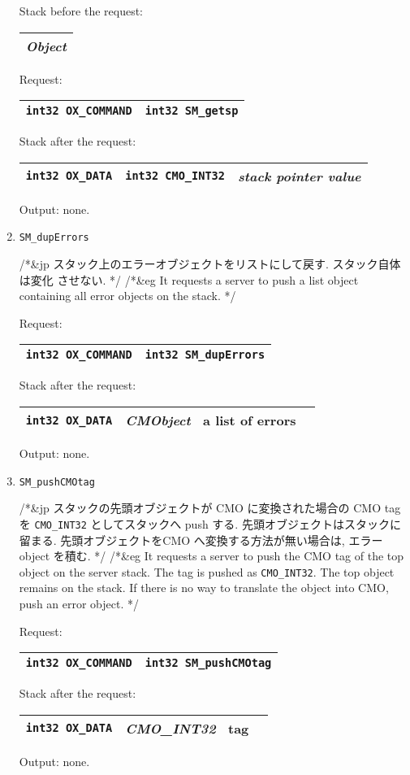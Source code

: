 \begin{enumerate}
Stack before the request:
\begin{tabular}{|c|}  \hline
{\it Object} \\
\hline 
\end{tabular}

Request:
\begin{tabular}{|c|c|}  \hline
{\tt int32 OX\_COMMAND} & {\tt int32 SM\_getsp} \\
\hline 
\end{tabular}

Stack after the request:
\begin{tabular}{|c|c|c|}  \hline
{\tt int32 OX\_DATA} & {\tt int32 CMO\_INT32} & {\it stack pointer value} \\
\hline 
\end{tabular}

Output:  none.

\item
\begin{verbatim}
SM_dupErrors
\end{verbatim}
/*&jp
スタック上のエラーオブジェクトをリストにして戻す.  スタック自体は変化
させない.
*/
/*&eg
It requests a server to push a list object containing all error objects on the stack.
*/

Request:
\begin{tabular}{|c|c|}  \hline
{\tt int32 OX\_COMMAND} & {\tt int32 SM\_dupErrors} \\
\hline 
\end{tabular}

Stack after the request:
\begin{tabular}{|c|c|c|}  \hline
{\tt int32 OX\_DATA} & {\sl CMObject} \ a list of errors\\
\hline 
\end{tabular}

Output: none.

\item
\begin{verbatim}
SM_pushCMOtag
\end{verbatim}
/*&jp
スタックの先頭オブジェクトが CMO に変換された場合の CMO tag を
{\tt CMO\_INT32} としてスタックへ push する.
先頭オブジェクトはスタックに留まる.
先頭オブジェクトをCMO へ変換する方法が無い場合は, エラー object を積む.
*/
/*&eg
It requests a server to push the CMO tag of the top object on the server
stack. The tag is pushed as {\tt CMO\_INT32}.
The top object remains on the stack.
If there is no way to translate the object into CMO,
push an error object.
*/

Request:
\begin{tabular}{|c|c|}  \hline
{\tt int32 OX\_COMMAND} & {\tt int32 SM\_pushCMOtag} \\
\hline 
\end{tabular}

Stack after the request:
\begin{tabular}{|c|c|c|}  \hline
{\tt int32 OX\_DATA} & {\sl CMO\_INT32} \ tag\\
\hline 
\end{tabular}

Output: none.
\end{enumerate}


